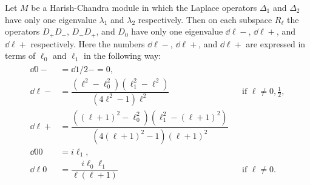 \begin{proposition}\label{prop:eigenvaluesforDs}
  Let $M$ be a Harish-Chandra module in which the Laplace operators $\Delta_1$ and $\Delta_2$ have only one eigenvalue $\lambda_1$ and $\lambda_2$ respectively. Then on each subspace $R_\ell$ the operators $D_+D_-$, $D_-D_+$, and $D_0$ have only one eigenvalue $\dd{\ell}{-}$, $\dd{\ell}{+}$, and $\dd{\ell}{+}$ respectively. Here the numbers $\dd{\ell}{-}$, $\dd{\ell}{+}$, and $\dd{\ell}{+}$ are expressed in terms of $\ell_0$ and $\ell_1$ in the following way:
  \begin{align}
    \begin{aligned}
      \dd{0}{-} &= \dd{1/2}{-}=0, \\
      \dd{\ell}{-} &= \dfrac{(\ell^2-\ell_0^2)(\ell_1^2-\ell^2)}{(4\ell^2-1)\ell^2} && \mbox{if } \ell\neq 0,\tfrac{1}{2}, \\
      \dd{\ell}{+} &= \dfrac{((\ell+1)^2-\ell_0^2)(\ell_1^2-(\ell+1)^2)}{(4(\ell+1)^2-1)(\ell+1)^2} \\
      \dd{0}{0} &= i\ell_1, \\
      \dd{\ell}{0} &= \dfrac{i\ell_0\ell_1}{\ell(\ell+1)} && \mbox{if }\ell\neq 0.
    \end{aligned}
  \end{align}
\end{proposition}
